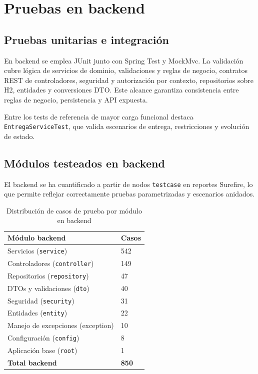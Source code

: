 \FloatBarrier
\section{Pruebas en backend}

\subsection{Pruebas unitarias e integraci\'on}

En backend se emplea JUnit junto con Spring Test y MockMvc.
La validaci\'on cubre l\'ogica de servicios de dominio, validaciones y reglas de negocio, contratos REST de controladores, seguridad y autorizaci\'on por contexto, repositorios sobre H2, entidades y conversiones DTO. Este alcance garantiza consistencia entre reglas de negocio, persistencia y API expuesta.

Entre los tests de referencia de mayor carga funcional destaca
\texttt{EntregaServiceTest}, que valida escenarios de entrega,
restricciones y evoluci\'on de estado.

\subsection{M\'odulos testeados en backend}

El backend se ha cuantificado a partir de nodos \texttt{testcase}
en reportes Surefire, lo que permite reflejar correctamente pruebas
parametrizadas y escenarios anidados.

\begin{table}[!htbp]
\centering
\begin{tabular}{|P{5.6cm}|P{2.2cm}|}
\hline
\textbf{M\'odulo backend} & \textbf{Casos} \\
\hline
Servicios (\texttt{service}) & 542 \\
\hline
Controladores (\texttt{controller}) & 149 \\
\hline
Repositorios (\texttt{repository}) & 47 \\
\hline
DTOs y validaciones (\texttt{dto}) & 40 \\
\hline
Seguridad (\texttt{security}) & 31 \\
\hline
Entidades (\texttt{entity}) & 22 \\
\hline
Manejo de excepciones (exception) & 10 \\
\hline
Configuraci\'on (\texttt{config}) & 8 \\
\hline
Aplicaci\'on base (\texttt{root}) & 1 \\
\hline
\textbf{Total backend} & \textbf{850} \\
\hline
\end{tabular}
\caption{Distribuci\'on de casos de prueba por m\'odulo en backend}
\label{tab:backend-modulos-testeados}
\end{table}

